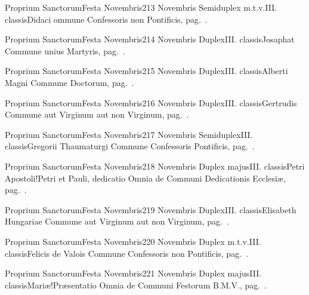\documentclass[liber-responsorialis.tex]{subfiles}
\begin{document}
	{Proprium Sanctorum}{Festa Novembris}{2}{13 Novembris}
	{Semiduplex m.t.v.}{III. classis}{Didaci}
	{ommune Confessoris non Pontificis, pag.\ \pageref{M-CONP}.}
	{}

	{Proprium Sanctorum}{Festa Novembris}{2}{14 Novembris}
	{Duplex}{III. classis}{Josaphat}
	{Commune unius Martyris, pag.\ \pageref{M-UMEX}.}
	{}

	{Proprium Sanctorum}{Festa Novembris}{2}{15 Novembris}
	{Duplex}{III. classis}{Alberti Magni}
	{Commune Doctorum, pag.\ \pageref{M-CODO}.}
	{}

	{Proprium Sanctorum}{Festa Novembris}{2}{16 Novembris}
	{Duplex}{III. classis}{Gertrudis}
	{Commune aut Virginum aut non Virginum, pag.\ \pageref{M-MU}.}
	{}

	{Proprium Sanctorum}{Festa Novembris}{2}{17 Novembris}
	{Semiduplex}{III. classis}{Gregorii Thaumaturgi}
	{Commune Confessoris Pontificis, pag.\ \pageref{M-COPO}.}
	{}

	{Proprium Sanctorum}{Festa Novembris}{2}{18 Novembris}
	{Duplex majus}{III. classis}{Petri Apostoli!Petri et Pauli, dedicatio}
	{Omnia de Communi Dedicationis Ecclesiæ, pag.\ \pageref{M-CDED}.}
	{}

	{Proprium Sanctorum}{Festa Novembris}{2}{19 Novembris}
	{Duplex}{III. classis}{Elisabeth Hungariae}
	{Commune aut Virginum aut non Virginum, pag.\ \pageref{M-MU}.}
	{}

	{Proprium Sanctorum}{Festa Novembris}{2}{20 Novembris}
	{Duplex m.t.v.}{III. classis}{Felicis de Valois}
	{Commune Confessoris non Pontificis, pag.\ \pageref{M-CONP}.}
	{}

	{Proprium Sanctorum}{Festa Novembris}{2}{21 Novembris}
	{Duplex majus}{III. classis}{Mariæ!Præsentatio}
	{Omnia de Communi Festorum B.M.V., pag.\ \pageref{M-CBMV}.}
	{}
\end{document}
